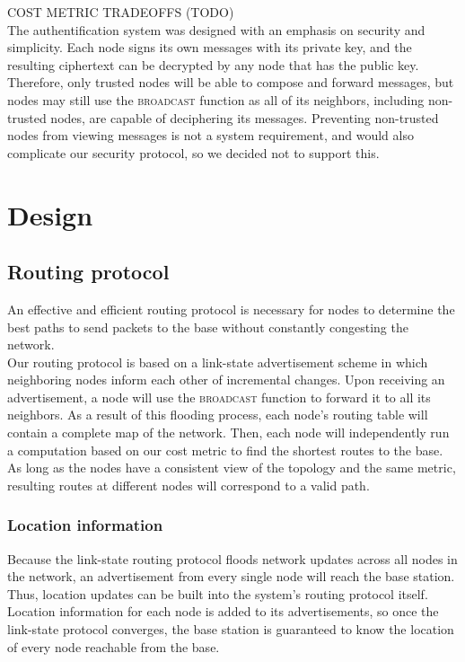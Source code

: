 \documentclass[letterpaper]{article}
\begin{document}
\noindent COST METRIC TRADEOFFS (TODO)
\\

\noindent The authentification system was designed with an emphasis on security and simplicity.
Each node signs its own messages with its private key, and the resulting ciphertext can be decrypted by any
node that has the public key. Therefore, only trusted nodes will be able to compose and forward messages, but
nodes may still use the \textsc{broadcast} function as all of its neighbors, including non-trusted nodes, are
capable of deciphering its messages. Preventing non-trusted nodes from viewing messages is not a system 
requirement, and would also complicate our security protocol, so we decided not to support this.

\section{Design}

\subsection{Routing protocol}

An effective and efficient routing protocol is necessary for nodes to determine the best paths to send
packets to the base without constantly congesting the network.
\\

\noindent Our routing protocol is based on a link-state advertisement scheme in which neighboring nodes 
inform each other of incremental changes. Upon receiving an advertisement, a node will use the 
\textsc{broadcast} function to forward it to all its neighbors. As a result of this flooding process,
each node's routing table will contain a complete map of the network. Then, each node will independently
run a computation based on our cost metric to find the shortest routes to the base. As long as the nodes
have a consistent view of the topology and the same metric, resulting routes at different nodes will
correspond to a valid path.

\subsubsection{Location information}

\noindent Because the link-state routing protocol floods network updates across all nodes in the network,
an advertisement from every single node will reach the base station. Thus, location updates can be built 
into the system's routing protocol itself. Location information for each node is added to its 
advertisements, so once the link-state protocol converges, the base station is guaranteed to know the
location of every node reachable from the base.
\end{document}

